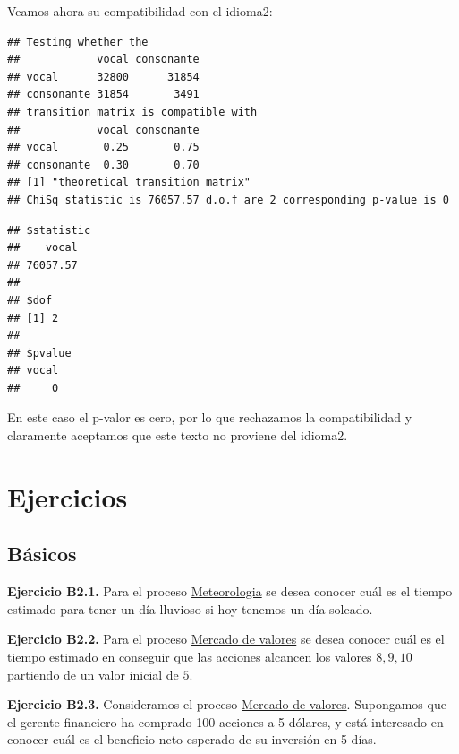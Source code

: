 \documentclass[
]{book}
\newenvironment{Shaded}{\begin{snugshade}}{\end{snugshade}}
\newcommand{\CommentTok}[1]{\textcolor[rgb]{0.56,0.35,0.01}{\textit{#1}}}
\newcommand{\FunctionTok}[1]{\textcolor[rgb]{0.00,0.00,0.00}{#1}}
\newcommand{\NormalTok}[1]{#1}
\newcommand{\SpecialCharTok}[1]{\textcolor[rgb]{0.00,0.00,0.00}{#1}}
\theoremstyle{definition}
\theoremstyle{definition}
\theoremstyle{definition}
\theoremstyle{definition}
\theoremstyle{remark}
\begin{document}
Veamos ahora su compatibilidad con el idioma2:

\begin{Shaded}
\end{Shaded}

\begin{verbatim}
## Testing whether the
##            vocal consonante
## vocal      32800      31854
## consonante 31854       3491
## transition matrix is compatible with
##            vocal consonante
## vocal       0.25       0.75
## consonante  0.30       0.70
## [1] "theoretical transition matrix"
## ChiSq statistic is 76057.57 d.o.f are 2 corresponding p-value is 0
\end{verbatim}

\begin{verbatim}
## $statistic
##    vocal 
## 76057.57 
## 
## $dof
## [1] 2
## 
## $pvalue
## vocal 
##     0
\end{verbatim}

En este caso el p-valor es cero, por lo que rechazamos la compatibilidad y claramente aceptamos que este texto no proviene del idioma2.

\hypertarget{ejer-u2}{%
\section{Ejercicios}\label{ejer-u2}}

\hypertarget{buxe1sicos-1}{%
\subsection{Básicos}\label{buxe1sicos-1}}

\textbf{Ejercicio B2.1.} Para el proceso \protect\hyperlink{meteo}{Meteorologia} se desea conocer cuál es el tiempo estimado para tener un día lluvioso si hoy tenemos un día soleado.

\textbf{Ejercicio B2.2.} Para el proceso \protect\hyperlink{mercadovalores}{Mercado de valores} se desea conocer cuál es el tiempo estimado en conseguir que las acciones alcancen los valores \(8, 9, 10\) partiendo de un valor inicial de \(5\).

\textbf{Ejercicio B2.3.} Consideramos el proceso \protect\hyperlink{mercadovalores}{Mercado de valores}. Supongamos que el gerente financiero ha comprado 100 acciones a 5 dólares, y está interesado en conocer cuál es el beneficio neto esperado de su inversión en 5 días.
\end{document}
